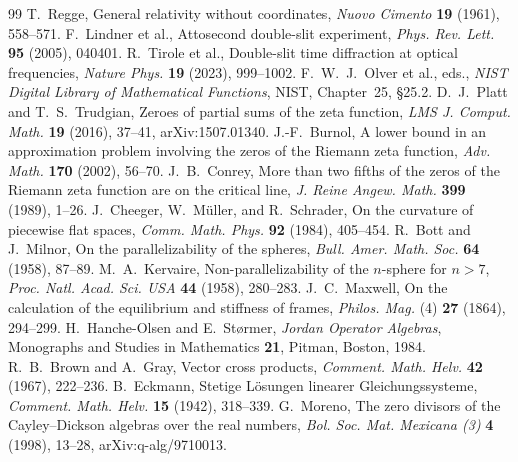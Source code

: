 \documentclass[11pt,reqno]{amsart}
\theoremstyle{definition}
\theoremstyle{remark}
\numberwithin{equation}{section}
\begin{document}
\begin{thebibliography}{99}
 T.~Regge, General relativity without coordinates, \emph{Nuovo Cimento} \textbf{19} (1961), 558--571.
 F.~Lindner et al., Attosecond double-slit experiment, \emph{Phys. Rev. Lett.} \textbf{95} (2005), 040401.
 R.~Tirole et al., Double-slit time diffraction at optical frequencies, \emph{Nature Phys.} \textbf{19} (2023), 999--1002.
 F.~W.~J.~Olver et al., eds., \emph{NIST Digital Library of Mathematical Functions}, NIST, Chapter~25, \S25.2.
 D.~J.~Platt and T.~S.~Trudgian, Zeroes of partial sums of the zeta function, \emph{LMS J. Comput. Math.} \textbf{19} (2016), 37--41, arXiv:1507.01340.
 J.-F.~Burnol, A lower bound in an approximation problem involving the zeros of the Riemann zeta function, \emph{Adv. Math.} \textbf{170} (2002), 56--70.
 J.~B.~Conrey, More than two fifths of the zeros of the Riemann zeta function are on the critical line, \emph{J. Reine Angew. Math.} \textbf{399} (1989), 1--26.
 J.~Cheeger, W.~M\"uller, and R.~Schrader, On the curvature of piecewise flat spaces, \emph{Comm. Math. Phys.} \textbf{92} (1984), 405--454.
 R.~Bott and J.~Milnor, On the parallelizability of the spheres, \emph{Bull. Amer. Math. Soc.} \textbf{64} (1958), 87--89.
 M.~A.~Kervaire, Non-parallelizability of the $n$-sphere for $n>7$, \emph{Proc. Natl. Acad. Sci. USA} \textbf{44} (1958), 280--283.
 J.~C.~Maxwell, On the calculation of the equilibrium and stiffness of frames, \emph{Philos. Mag.} (4) \textbf{27} (1864), 294--299.
 H.~Hanche-Olsen and E.~St{\o}rmer, \emph{Jordan Operator Algebras}, Monographs and Studies in Mathematics \textbf{21}, Pitman, Boston, 1984.
 R.~B.~Brown and A.~Gray, Vector cross products, \emph{Comment. Math. Helv.} \textbf{42} (1967), 222--236.
 B.~Eckmann, Stetige L\"osungen linearer Gleichungssysteme, \emph{Comment. Math. Helv.} \textbf{15} (1942), 318--339.
 G.~Moreno, The zero divisors of the Cayley--Dickson algebras over the real numbers, \emph{Bol. Soc. Mat. Mexicana (3)} \textbf{4} (1998), 13--28, arXiv:q-alg/9710013.

\end{thebibliography}
\end{document}
